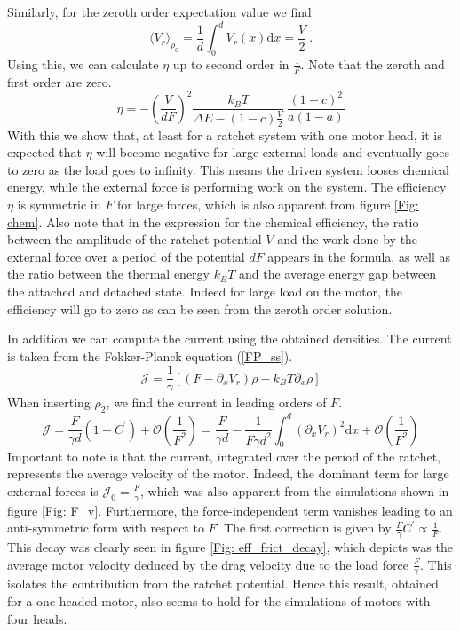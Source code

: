 \documentclass[aps,pre,onecolumn,showpacs,showkeys,a4paper]{revtex4}
\newcommand{\rmd}{{\mathrm d}}
\begin{document}
Similarly, for the zeroth order expectation value we find
\begin{equation}
\langle V_r \rangle_{\rho_0} = \frac{1}{d}\int_0^d V_r(x)\rmd x = \frac{V}{2}\ .
\end{equation}
Using this, we can calculate $\eta$ up to second order in $\frac{1}{F}$. Note that the zeroth and first order are zero.
\begin{equation}
\eta = -\left(\frac{V}{dF}\right)^2\frac{k_BT}{\Delta E - (1-c)\frac{V}{2}}\ \frac{\left(1-c\right)^2}{a(1-a)}
\end{equation}
With this we show that, at least for a ratchet system with one motor head, it is expected that $\eta$ will become negative for large external loads and eventually goes to zero as the load goes to infinity. This means the driven system looses chemical energy, while the external force is performing work on the system. The efficiency $\eta$ is symmetric in $F$ for large forces, which is also apparent from figure \ref{Fig: chem}. Also note that in the expression for the chemical efficiency, the ratio between the amplitude of the ratchet potential $V$ and the work done by the external force over a period of the potential $dF$ appears in the formula, as well as the ratio between the thermal energy $k_BT$ and the average energy gap between the attached and detached state. Indeed for large load on the motor, the efficiency will go to zero as can be seen from the zeroth order solution.
\par
In addition we can compute the current using the obtained densities. The current is taken from the Fokker-Planck equation (\ref{FP_ss}).
\begin{equation}
\mathcal{J} = \frac{1}{\gamma}\left[\left(F - \partial_x V_r\right)\rho - k_BT\partial_x\rho\right] 
\end{equation}
When inserting $\rho_2$, we find the current in leading orders of $F$.
\begin{equation}
\mathcal{J} = \frac{F}{\gamma d}\left(1+C^\prime\right)  +  \mathcal{O}(\frac{1}{F^2}) = \frac{F}{\gamma d} - \frac{1}{F\gamma d^2}\int^d_0\left(\partial_x V_r\right)^2 \rmd x + \mathcal{O}(\frac{1}{F^2}) 
\end{equation}
Important to note is that the current, integrated over the period of the ratchet, represents the average velocity of the motor. Indeed, the dominant term for large external forces is $\mathcal{J}_0 = \frac{F}{\gamma}$, which was also apparent from the simulations shown in figure \ref{Fig: F_v}. Furthermore, the force-independent term vanishes leading to an anti-symmetric form with respect to $F$. The first correction is given by $\frac{F}{\gamma}C^\prime\propto \frac{1}{F}$. This decay was clearly seen in figure \ref{Fig: eff_frict_decay}, which depicts was the average motor velocity deduced by the drag velocity due to the load force $\frac{F}{\gamma}$. This isolates the contribution from the ratchet potential. Hence this result, obtained for a one-headed motor, also seems to hold for the simulations of motors with four heads. 
\end{document}
